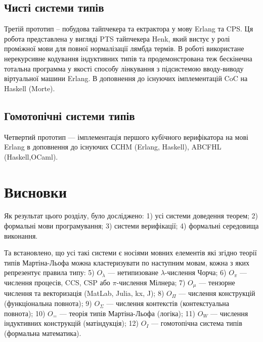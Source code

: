 \subsection{Чисті системи типів}
Третій прототип -- побудова тайпчекера та ектрактора у мову Erlang та CPS.
Ця робота представлена у вигляді PTS тайпчекера Henk, який вистує у ролі
проміжної мови для повної нормалізації лямбда термів. В роботі використане
нерекурсивне кодування індуктивних типів та продемонстрована теж бескінечна
тотальна программа у якості способу лінкування з підсистемою вводу-виводу
віртуальної машини Erlang. В доповнення до існуючих імплементацій CoC
на Haskell (Morte).

\subsection{Гомотопічні системи типів}
Четвертий прототип --- імплементація першого кубічного верифікатора на
мові Erlang в доповнення до існуючих ССHM (Erlang, Haskell),
ABCFHL (Haskell,OCaml).

\section{Висновки}
Як результат цього розділу, було досліджено:
1) усі системи доведення теорем;
2) формальні мови програмування;
3) системи верифікації;
4) формальні середовища виконання.

Та встановлено, що усі такі системи є носіями
мовних елементів які згідно теорії типів Мартіна-Льофа можна
кластеризувати по наступним мовам, кожна з яких репрезентує правила типу:
5) $O_\lambda$ --- нетипизоване $\lambda$-числення Чорча;
6) $O_\pi$ --- числення процесів, CCS, CSP або $\pi$-числення Мілнера;
7) $O_\mu$ --- тензорне числення та векторизація (MatLab, Julia, kx, J);
8) $O_\Pi$ --- числення конструкцій (функціональна повнота);
9) $O_\Sigma$ --- числення контекстів (контекстуальна повнота);
10) $O_=$ --- теорія типів Мартіна-Льофа (логіка);
11) $O_W$ --- числення індуктивних конструкцій (матіндукція);
12) $O_I$ --- гомотопічна система типів (формальна математика).
